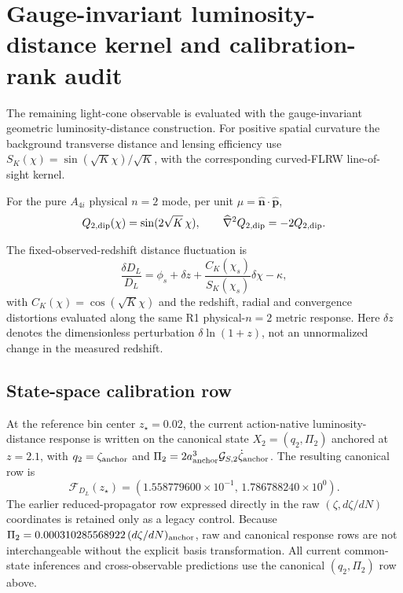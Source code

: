 \section{Gauge-invariant luminosity-distance kernel and calibration-rank audit}
\label{sec:r1-n2-DL-kernel}

The remaining light-cone observable is evaluated with the gauge-invariant geometric luminosity-distance construction.\citep{YooScaccabarozzi2016}
For positive spatial curvature the background transverse distance and lensing efficiency use $S_K(\chi)=\sin(\sqrt K\chi)/\sqrt K$, with the corresponding curved-FLRW line-of-sight kernel.\citep{PyneBirkinshaw2004}

For the pure $A_{4i}$ physical $n=2$ mode, per unit $\mu=\hat{\mathbf n}\cdot\hat{\mathbf p}$,
\begin{equation}
Q_{2,\rm dip}(\chi)=\sin(2\sqrt K\,\chi),
\qquad \widehat\nabla^2 Q_{2,\rm dip}=-2Q_{2,\rm dip}.
\end{equation}

The fixed-observed-redshift distance fluctuation is
\begin{equation}
\boxed{
\frac{\delta D_L}{D_L}
=\phi_s+\delta z+\frac{C_K(\chi_s)}{S_K(\chi_s)}\delta\chi-\kappa,
}
\end{equation}
with $C_K(\chi)=\cos(\sqrt K\chi)$ and the redshift, radial and convergence distortions evaluated along the same R1 physical-$n=2$ metric response. Here $\delta z$ denotes the dimensionless perturbation $\delta\ln(1+z)$, not an unnormalized change in the measured redshift.

\subsection{State-space calibration row}
At the reference bin center $z_\star=0.02$, the current action-native luminosity-distance response is written on the canonical state $X_2=(q_2,\Pi_2)$ anchored at $z=2.1$, with $q_2=\zeta_{\rm anchor}$ and $\Pi_2=2a_{\rm anchor}^3\mathcal G_{S,2}\dot\zeta_{\rm anchor}$. The resulting canonical row is
\begin{equation}
\boxed{
\mathcal F_{D_L}(z_\star)=(1.558779600\times10^{-1},\,1.786788240\times10^{0}).
}
\end{equation}
The earlier reduced-propagator row expressed directly in the raw $(\zeta,d\zeta/dN)$ coordinates is retained only as a legacy control. Because $\Pi_2=0.000310285568922\,(d\zeta/dN)_{\rm anchor}$, raw and canonical response rows are not interchangeable without the explicit basis transformation. All current common-state inferences and cross-observable predictions use the canonical $(q_2,\Pi_2)$ row above.

